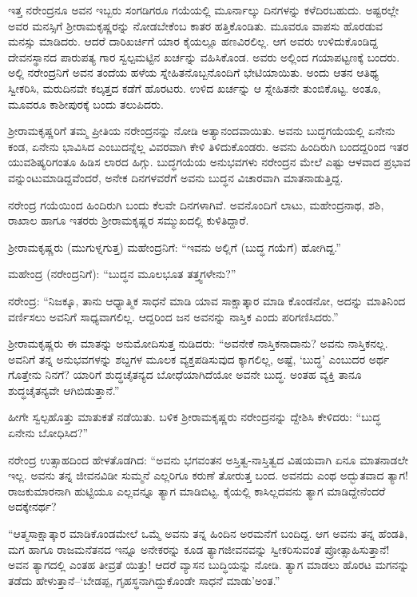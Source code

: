 ಇತ್ತ ನರೇಂದ್ರನೂ ಅವನ ಇಬ್ಬರು ಸಂಗಡಿಗರೂ ಗಯೆಯಲ್ಲಿ ಮೂರ್ನಾಲ್ಕು ದಿನಗಳನ್ನು ಕಳೆದಿರಬಹುದು. ಅಷ್ಟರಲ್ಲೇ ಅವರ ಮನಸ್ಸಿಗೆ ಶ್ರೀರಾಮಕೃಷ್ಣರನ್ನು ನೋಡಬೇಕೆಂಬ ಕಾತರ ಹತ್ತಿಕೊಂಡಿತು. ಮೂವರೂ ವಾಪಸು ಹೊರಡುವ ಮನಸ್ಸು ಮಾಡಿದರು. ಆದರೆ ದಾರಿಖರ್ಚಿಗೆ ಯಾರ ಕೈಯಲ್ಲೂ ಹಣವಿರಲಿಲ್ಲ. ಆಗ ಅವರು ಉಳಿದುಕೊಂಡಿದ್ದ ದೇವನಸ್ಥಾನದ ಪಾರುಪತ್ಯ ಗಾರ ಸ್ವಲ್ಪಮಟ್ಟಿನ ಖರ್ಚನ್ನು ವಹಿಸಿಕೊಂಡ. ಅವರು ಅಲ್ಲಿಂದ ಗಯಾಪಟ್ಟಣಕ್ಕೆ ಬಂದರು. ಅಲ್ಲಿ ನರೇಂದ್ರನಿಗೆ ಅವನ ತಂದೆಯ ಹಳೆಯ ಸ್ನೇಹಿತನೊಬ್ಬನೊಂದಿಗೆ ಭೇಟಿಯಾಯಿತು. ಅಂದು ಆತನ ಆತಿಥ್ಯ ಸ್ವೀಕರಿಸಿ, ಮರುದಿನವೇ ಕಲ್ಕತ್ತದ ಕಡೆಗೆ ಹೊರಟರು. ಉಳಿದ ಖರ್ಚನ್ನು ಆ ಸ್ನೇಹಿತನೇ ತುಂಬಿಕೊಟ್ಟ. ಅಂತೂ, ಮೂವರೂ ಕಾಶೀಪುರಕ್ಕೆ ಬಂದು ತಲುಪಿದರು. 

ಶ್ರೀರಾಮಕೃಷ್ಣರಿಗೆ ತಮ್ಮ ಪ್ರೀತಿಯ ನರೇಂದ್ರನನ್ನು ನೋಡಿ ಅತ್ಯಾನಂದವಾಯಿತು. ಅವನು ಬುದ್ಧಗಯೆಯಲ್ಲಿ ಏನೇನು ಕಂಡ, ಏನೇನು ಭಾವಿಸಿದ ಎಂಬುದನ್ನೆಲ್ಲ ವಿವರವಾಗಿ ಕೇಳಿ ತಿಳಿದುಕೊಂಡರು. ಅವನು ಹಿಂದಿರುಗಿ ಬಂದದ್ದರಿಂದ ಇತರ ಯುವಶಿಷ್ಯರಿಗಂತೂ ಹಿಡಿಸ ಲಾರದ ಹಿಗ್ಗು. ಬುದ್ಧಗಯೆಯ ಅನುಭವಗಳು ನರೇಂದ್ರನ ಮೇಲೆ ಎಷ್ಟು ಆಳವಾದ ಪ್ರಭಾವ ವನ್ನುಂಟುಮಾಡಿದ್ದವೆಂದರೆ, ಅನೇಕ ದಿನಗಳವರೆಗೆ ಅವನು ಬುದ್ಧನ ವಿಚಾರವಾಗಿ ಮಾತನಾಡುತ್ತಿದ್ದ.

ನರೇಂದ್ರ ಗಯೆಯಿಂದ ಹಿಂದಿರುಗಿ ಬಂದು ಕೆಲವೇ ದಿನಗಳಾಗಿವೆ. ಅವನೊಂದಿಗೆ ಲಾಟು, ಮಹೇಂದ್ರನಾಥ, ಶಶಿ, ರಾಖಾಲ ಹಾಗೂ ಇತರರು ಶ್ರೀರಾಮಕೃಷ್ಣರ ಸಮ್ಮುಖದಲ್ಲಿ ಕುಳಿತಿದ್ದಾರೆ.

ಶ್ರೀರಾಮಕೃಷ್ಣರು (ಮುಗುಳ್ನಗುತ್ತ) ಮಹೇಂದ್ರನಿಗೆ: “ಇವನು ಅಲ್ಲಿಗೆ (ಬುದ್ಧ ಗಯೆಗೆ) ಹೋಗಿದ್ದ.”

ಮಹೇಂದ್ರ (ನರೇಂದ್ರನಿಗೆ): “ಬುದ್ಧನ ಮೂಲಭೂತ ತತ್ತ್ವಗಳೇನು?”

ನರೇಂದ್ರ: “ನಿಜಕ್ಕೂ, ತಾನು ಆಧ್ಯಾತ್ಮಿಕ ಸಾಧನೆ ಮಾಡಿ ಯಾವ ಸಾಕ್ಷಾತ್ಕಾರ ಮಾಡಿ ಕೊಂಡನೋ, ಅದನ್ನು ಮಾತಿನಿಂದ ವರ್ಣಿಸಲು ಅವನಿಗೆ ಸಾಧ್ಯವಾಗಲಿಲ್ಲ. ಆದ್ದರಿಂದ ಜನ ಅವನನ್ನು ನಾಸ್ತಿಕ ಎಂದು ಪರಿಗಣಿಸಿದರು.”

ಶ್ರೀರಾಮಕೃಷ್ಣರು ಈ ಮಾತನ್ನು ಅನುಮೋದಿಸುತ್ತ ನುಡಿದರು: “ಅವನೇಕೆ ನಾಸ್ತಿಕನಾದಾನು? ಅವನು ನಾಸ್ತಿಕನಲ್ಲ. ಅವನಿಗೆ ತನ್ನ ಅನುಭವಗಳನ್ನು ಶಬ್ದಗಳ ಮೂಲಕ ವ್ಯಕ್ತಪಡಿಸುವುದ ಕ್ಕಾಗಲಿಲ್ಲ, ಅಷ್ಟೆ, ‘ಬುದ್ಧ’ ಎಂಬುದರ ಅರ್ಥ ಗೊತ್ತೇನು ನಿನಗೆ? ಯಾರಿಗೆ ಶುದ್ಧಚೈತನ್ಯದ ಬೋಧೆಯಾಗಿದೆಯೋ ಅವನೇ ಬುದ್ಧ. ಅಂತಹ ವ್ಯಕ್ತಿ ತಾನೂ ಶುದ್ಧಚೈತನ್ಯವೇ ಆಗಿಬಿಡುತ್ತಾನೆ.”

ಹೀಗೇ ಸ್ವಲ್ಪಹೊತ್ತು ಮಾತುಕತೆ ನಡೆಯಿತು. ಬಳಿಕ ಶ್ರೀರಾಮಕೃಷ್ಣರು ನರೇಂದ್ರನನ್ನು ದ್ದೇಶಿಸಿ ಕೇಳಿದರು: “ಬುದ್ಧ ಏನೇನು ಬೋಧಿಸಿದ?”

ನರೇಂದ್ರ ಉತ್ಸಾಹದಿಂದ ಹೇಳತೊಡಗಿದ: “ಅವನು ಭಗವಂತನ ಅಸ್ತಿತ್ವ-ನಾಸ್ತಿತ್ವದ ವಿಷಯವಾಗಿ ಏನೂ ಮಾತನಾಡಲೇ ಇಲ್ಲ. ಅವನು ತನ್ನ ಜೀವನವಿಡೀ ಸುಮ್ಮನೆ ಎಲ್ಲರಿಗೂ ಕರುಣೆ ತೋರುತ್ತ ಬಂದ. ಅವನದು ಎಂಥ ಅದ್ಭುತವಾದ ತ್ಯಾಗ! ರಾಜಕುಮಾರನಾಗಿ ಹುಟ್ಟಿಯೂ ಎಲ್ಲವನ್ನೂ ತ್ಯಾಗ ಮಾಡಿಬಿಟ್ಟ. ಕೈಯಲ್ಲಿ ಕಾಸಿಲ್ಲದವನು ತ್ಯಾಗ ಮಾಡಿದ್ದೇನೆಂದರೆ ಅದಕ್ಕೇನರ್ಥ?

“ಆತ್ಮಸಾಕ್ಷಾತ್ಕಾರ ಮಾಡಿಕೊಂಡಮೇಲೆ ಒಮ್ಮೆ ಅವನು ತನ್ನ ಹಿಂದಿನ ಅರಮನೆಗೆ ಬಂದಿದ್ದ. ಆಗ ಅವನು ತನ್ನ ಹೆಂಡತಿ, ಮಗ ಹಾಗೂ ರಾಜಮನೆತನದ ಇನ್ನೂ ಅನೇಕರನ್ನು ಕೂಡ ತ್ಯಾಗಜೀವನವನ್ನು ಸ್ವೀಕರಿಸುವಂತೆ ಪ್ರೋತ್ಸಾಹಿಸುತ್ತಾನೆ! ಅವನ ತ್ಯಾಗದಲ್ಲಿ ಎಂತಹ ತೀವ್ರತೆ ಯಿತ್ತು! ಆದರೆ ವ್ಯಾಸನ ಬುದ್ಧಿಯನ್ನು ನೋಡಿ. ತ್ಯಾಗ ಮಾಡಲು ಹೊರಟ ಮಗನನ್ನು ತಡೆದು ಹೇಳುತ್ತಾನೆ–‘ಬೇಡಪ್ಪ, ಗೃಹಸ್ಥನಾಗಿದ್ದುಕೊಂಡೇ ಸಾಧನೆ ಮಾಡು’ಅಂತ.”

